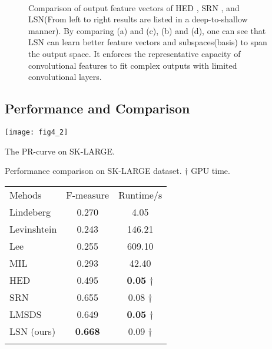 \documentclass[runningheads]{llncs}
\begin{document}
\begin{figure}[t]
\centering
{}
\quad 
{} \\
\quad 
{}
\caption{Comparison of output feature vectors of HED \cite{ref6}, SRN \cite{ref1}, and LSN(From left to right results are listed in a deep-to-shallow manner). By comparing (a) and (c), (b) and (d), one can see that LSN can learn better feature vectors and subspaces(basis) to span the output space. It enforces the representative capacity of convolutional features to fit complex outputs with limited convolutional layers.
}
\label{Bases}
\end{figure}

\subsection{Performance and Comparison}


{
\setlength\parindent{-0.5em}
\begin{minipage}{.48\textwidth}
\centering
\texttt{[image: fig4\_2]}
\makeatletter\def\@captype{figure}\makeatother
\caption{The PR-curve on SK-LARGE.  }
\end{minipage} \quad
\begin{minipage}{.49\textwidth}
  \makeatletter{}\makeatother
  \caption{Performance comparison  on SK-LARGE dataset. $\dagger$ GPU time.}
  \begin{tabular}{lcc}
    \hline
    Mehods & F-measure & Runtime/s \\
    \noalign{\smallskip}
    \hline
    \noalign{\smallskip}
    Lindeberg \cite{ref37} &	0.270 &	4.05 \\
    Levinshtein \cite{ref12} &	0.243 &	146.21 \\
    Lee \cite{ref13} &	0.255 &	609.10 \\
    MIL \cite{ref15} &	0.293 &	42.40 \\
    \hline
    HED \cite{ref6} &	0.495 &	\textbf{0.05} $\dagger$ \\
    SRN \cite{ref1} &	0.655 &	0.08 $\dagger$ \\
    LMSDS \cite{ref33} &	0.649 &	\textbf{0.05} $\dagger$ \\
    LSN (ours) & \textbf{0.668} &	0.09 $\dagger$ \\
    \hline
    \label{tab:sk_large}
  \end{tabular}
  \label{fig:sklarge}
\end{minipage}
}
\end{document}
